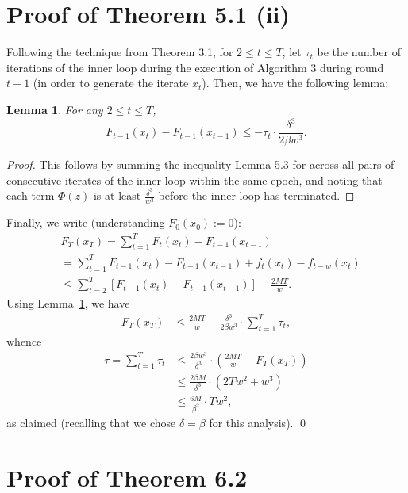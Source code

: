 \documentclass{article}
\newcommand{\pa}[1]{\left(#1\right)}
\newcommand{\bra}[1]{\left[#1\right]}
\newtheorem{lemma}[theorem]{Lemma}
\begin{document}
\begin{appendix}
\section{Proof of Theorem 5.1 (ii)}
Following the technique from Theorem 3.1, for $2 \leq t \leq T$, let $\tau_t$ be the number of iterations of the inner loop during the execution of Algorithm 3 during round $t-1$ (in order to generate the iterate $x_t$). Then, we have the following lemma:
\begin{lemma}
\label{lem:second-order-tau}
For any $2 \leq t \leq T$,
\[F_{t-1}(x_t) - F_{t-1}(x_{t-1}) \leq -\tau_t \cdot \frac{\delta^3}{2\beta w^3}. \]
\end{lemma}
\begin{proof}
This follows by summing the inequality Lemma 5.3 for across all pairs of consecutive iterates of the inner loop within the same epoch, and noting that each term $\Phi(z)$ is at least $\frac{\delta^3}{w^3}$ before the inner loop has terminated.
\end{proof}
Finally, we write (understanding $F_0(x_0) := 0$):
\begin{align*}
&F_T(x_T) = \sum_{t=1}^{T} F_{t}(x_{t}) - F_{t-1}(x_{t-1}) \\
&= \sum_{t=1}^{T} F_{t-1}(x_t) - F_{t-1}(x_{t-1}) + f_t(x_t) - f_{t-w}(x_t) \\
&\leq \sum_{t=2}^{T} \bra{ F_{t-1}(x_t) - F_{t-1}(x_{t-1}) } + \frac{2MT}{w}.
\end{align*}
Using Lemma~\ref{lem:second-order-tau}, we have
\begin{align*}
F_T(x_T) &\leq \frac{2MT}{w} - \frac{\delta^3}{2\beta w^3} \cdot \sum_{t=1}^T \tau_t,
\end{align*}
whence
\begin{align*}
\tau = \sum_{t=1}^T \tau_t &\leq \frac{2\beta w^3}{\delta^3} \cdot \pa{ \frac{2MT}{w} - F_T(x_T) } \\
&\leq \frac{2\beta M}{\delta^3} \cdot \pa{2Tw^2 + w^3} \\
&\leq \frac{6 M}{\beta^2} \cdot Tw^2,
\end{align*}
as claimed (recalling that we chose $\delta = \beta$ for this analysis).
\qed 
\section{Proof of Theorem 6.2}


\end{appendix}
\end{document}
